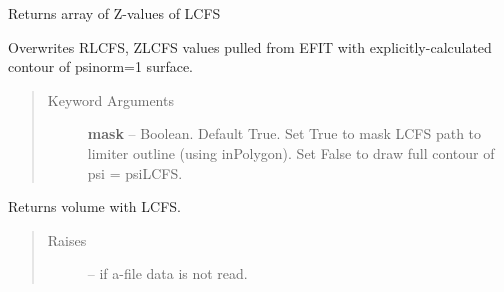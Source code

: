 \documentclass[letterpaper,10pt,english]{sphinxmanual}
\begin{document}
\begin{fulllineitems}

\begin{fulllineitems}
\label{eqtools:eqtools.eqdskreader.EqdskReader.getZLCFS}
Returns array of Z-values of LCFS

\end{fulllineitems}


\begin{fulllineitems}
\label{eqtools:eqtools.eqdskreader.EqdskReader.remapLCFS}
Overwrites RLCFS, ZLCFS values pulled from EFIT with explicitly-calculated contour
of psinorm=1 surface.
\begin{quote}\begin{description}
\item[{Keyword Arguments}] \leavevmode
\textbf{mask} --
Boolean.
Default True.  Set True to mask LCFS path to limiter outline (using inPolygon).
Set False to draw full contour of psi = psiLCFS.

\end{description}\end{quote}

\end{fulllineitems}


\begin{fulllineitems}
\label{eqtools:eqtools.eqdskreader.EqdskReader.getFluxVol}
\end{fulllineitems}


\begin{fulllineitems}
\label{eqtools:eqtools.eqdskreader.EqdskReader.getVolLCFS}
Returns volume with LCFS.
\begin{quote}\begin{description}
\item[{Raises }] \leavevmode
{} -- 
if a-file data is not read.

\end{description}\end{quote}


\end{fulllineitems}
\end{fulllineitems}
\end{document}

